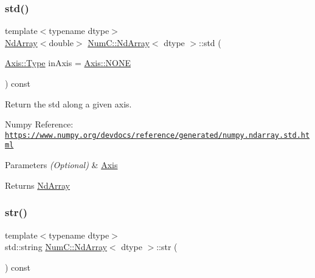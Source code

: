 \subsubsection{\texorpdfstring{std()}{std()}}
{\footnotesize\ttfamily template$<$typename dtype$>$ \\
\mbox{\hyperlink{class_num_c_1_1_nd_array}{Nd\+Array}}$<$double$>$ \mbox{\hyperlink{class_num_c_1_1_nd_array}{Num\+C\+::\+Nd\+Array}}$<$ dtype $>$\+::std (\begin{DoxyParamCaption}\item[{\mbox{\hyperlink{struct_num_c_1_1_axis_a8e689044ef1941a03482e730c5e7ebb3}{Axis\+::\+Type}}}]{in\+Axis = {\ttfamily \mbox{\hyperlink{struct_num_c_1_1_axis_a8e689044ef1941a03482e730c5e7ebb3a0ae033c4226f7184bf0050b101e7ed94}{Axis\+::\+N\+O\+NE}}} }\end{DoxyParamCaption}) const\hspace{0.3cm}{\ttfamily [inline]}}

Return the std along a given axis.

Numpy Reference\+: \href{https://www.numpy.org/devdocs/reference/generated/numpy.ndarray.std.html}{\tt https\+://www.\+numpy.\+org/devdocs/reference/generated/numpy.\+ndarray.\+std.\+html}


\begin{DoxyParams}{Parameters}
{\em (\+Optional)} & \mbox{\hyperlink{struct_num_c_1_1_axis}{Axis}} \\
\hline
\end{DoxyParams}
\begin{DoxyReturn}{Returns}
\mbox{\hyperlink{class_num_c_1_1_nd_array}{Nd\+Array}} 
\end{DoxyReturn}
\mbox{\label{class_num_c_1_1_nd_array_a405e8c1f1acb2abb77c0d505be554cea}} 
\subsubsection{\texorpdfstring{str()}{str()}}
{\footnotesize\ttfamily template$<$typename dtype$>$ \\
std\+::string \mbox{\hyperlink{class_num_c_1_1_nd_array}{Num\+C\+::\+Nd\+Array}}$<$ dtype $>$\+::str (\begin{DoxyParamCaption}{ }\end{DoxyParamCaption}) const\hspace{0.3cm}{\ttfamily [inline]}}

